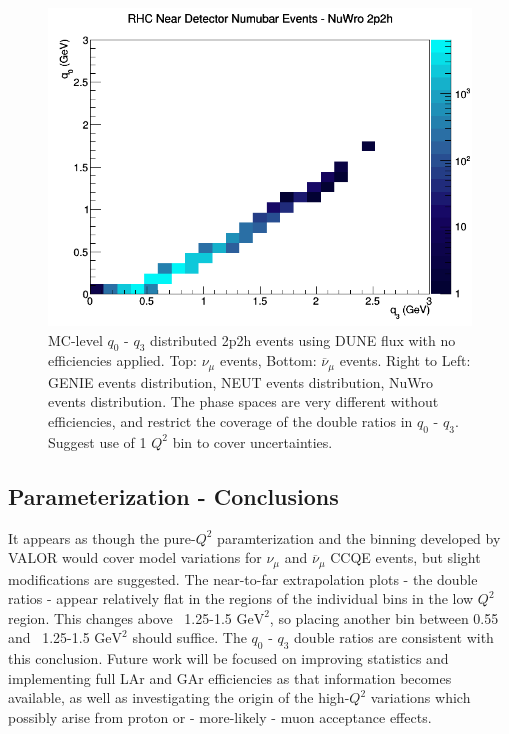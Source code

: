 \documentclass[12pt]{article}
\begin{document}
\begin{figure}[h]
\endminipage
{}
\includegraphics[width=\linewidth]{q0_q3/nominal/2p2h_RHC_ND_numubar_q3_q0_NuWro.png}
\endminipage
\caption{MC-level $q_0 \textrm{ - } q_3$ distributed 2p2h events using DUNE flux with no efficiencies applied. Top: $\nu_{\mu}$ events, Bottom: $\overline{\nu}_{\mu}$ events. Right to Left: GENIE events distribution, NEUT events distribution, NuWro events distribution. The phase spaces are very different without efficiencies, and restrict the coverage of the double ratios in $q_0 \textrm{ - } q_3$. Suggest use of 1 $Q^2$ bin to cover uncertainties.}
\label{fig:q0q3_2p2h_events}
\end{figure}
\FloatBarrier

\subsection{Parameterization - Conclusions}
It appears as though the pure-$Q^2$ paramterization and the binning developed by VALOR would cover model variations for $\nu_{\mu}$ and $\overline{\nu}_{\mu}$ CCQE events, but slight modifications are suggested. The near-to-far extrapolation plots - the double ratios - appear relatively flat in the regions of the individual bins in the low $Q^2$ region. This changes above ~1.25-1.5 $\textrm{GeV}^2$, so placing another bin between 0.55 and ~1.25-1.5 $\textrm{GeV}^2$ should suffice. The $q_0 \textrm{ - } q_3$ double ratios are consistent with this conclusion. Future work will be focused on improving statistics and implementing full LAr and GAr efficiencies as that information becomes available, as well as investigating the origin of the high-$Q^2$ variations which possibly arise from proton or - more-likely - muon acceptance effects. 
\end{document}
